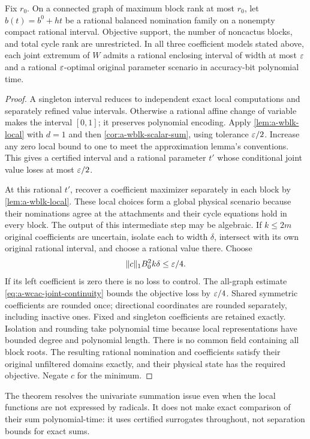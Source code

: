 \begin{theorem}
\label{thm:a-wblk-line}
Fix $r_0$. On a connected graph of maximum block rank at most $r_0$,
let $b(t)=b^0+ht$ be a rational balanced nomination family on a nonempty
compact rational interval. Objective support, the number of noncactus
blocks, and total cycle rank are unrestricted. In all three coefficient
models stated above, each joint extremum of $W$ admits a rational
enclosing interval of width at most $\varepsilon$ and a rational $\varepsilon$-optimal
original parameter scenario in accuracy-bit polynomial time.
\end{theorem}
\begin{proof}
A singleton interval reduces to independent exact local computations
and separately refined value intervals. Otherwise a rational affine
change of variable makes the interval $[0,1]$; it preserves polynomial
encoding. Apply \cref{lem:a-wblk-local} with $d=1$ and then
\cref{cor:a-wblk-scalar-sum}, using tolerance $\varepsilon/2$. Increase any zero
local bound to one to meet the approximation lemma's conventions. This
gives a certified interval and a rational parameter $t'$ whose conditional
joint value loses at most $\varepsilon/2$.

At this rational $t'$, recover a coefficient maximizer separately in
each block by \cref{lem:a-wblk-local}. These local choices form a global
physical scenario because their nominations agree at the attachments
and their cycle equations hold in every block. The output of this
intermediate step may be algebraic. If $k\le2m$ original coefficients
are uncertain, isolate each to width $\delta$, intersect with its own
original rational interval, and choose a rational value there. Choose
\[
 \|c\|_1 B_0^2 k\delta\le\varepsilon/4.
\]
If its left coefficient is zero there is no loss to control. The
all-graph estimate \eqref{eq:a-wcac-joint-continuity} bounds the objective
loss by $\varepsilon/4$. Shared symmetric coefficients are rounded once;
directional coordinates are rounded separately, including inactive ones.
Fixed and singleton coefficients are retained exactly. Isolation and
rounding take polynomial time because local representations have bounded
degree and polynomial length. There is no common field containing all
block roots. The resulting rational nomination and coefficients satisfy
their original unfiltered domains exactly, and their physical state has
the required objective. Negate $c$ for the minimum.
\end{proof}

The theorem resolves the univariate summation issue even when the local
functions are not expressed by radicals. It does not make exact
comparison of their sum polynomial-time: it uses certified surrogates
throughout, not separation bounds for exact sums.

